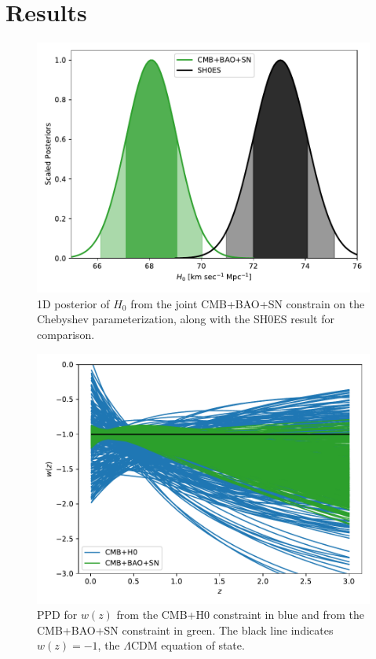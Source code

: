 \documentclass[
 reprint,
 amsmath,amssymb,
 aps,
]{revtex4-2}
\begin{document}
\section{Results}

\begin{figure}
    \centering
    \includegraphics[width=\columnwidth]{CMB+BAO+SN_H0_post.pdf}
    \caption{1D posterior of $H_0$ from the joint CMB+BAO+SN constrain on the Chebyshev parameterization, along with the SH0ES result for comparison.}
    \label{fig:H0}
\end{figure}

\begin{figure}
    \centering
    \includegraphics[width=\columnwidth]{cheb_combo_wz_check.pdf}
    \caption{PPD for $w(z)$ from the CMB+H0 constraint in blue and from the CMB+BAO+SN constraint in green. The black line indicates $w(z)=-1$, the $\Lambda$CDM equation of state.}
    \label{fig:w_z}
\end{figure}
\end{document}
